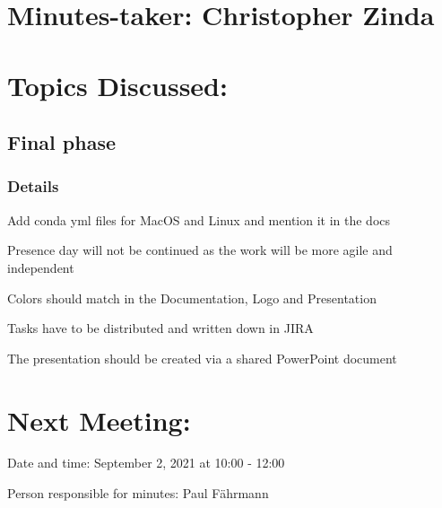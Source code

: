 \documentclass[11pt]{meetingmins} %
\begin{document}
\maketitle

\section{Minutes-taker: Christopher Zinda}

\section{Topics Discussed:}

\subsection{Final phase}
\subsubsection{Details}
\begin{hiddensubitems}
    \item Add conda yml files for MacOS and Linux and mention it in the docs
    \item Presence day will not be continued as the work will be more agile and independent
    \item Colors should match in the Documentation, Logo and Presentation
    \item Tasks have to be distributed and written down in JIRA
    \item The presentation should be created via a shared PowerPoint document
\end{hiddensubitems}

\section{Next Meeting:}
\begin{hiddensubitems}
    \item Date and time: September 2, 2021 at 10:00 - 12:00
    \item Person responsible for minutes: Paul Fährmann
\end{hiddensubitems}
\end{document}
